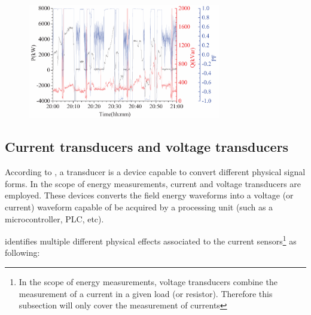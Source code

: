 \begin{figure}[h!]
	\centering
	\begin{minipage}{0.8\textwidth}
		\centering
				\vspace{-0.75em}
		\includegraphics[width=0.75\textwidth,keepaspectratio]{figures/32.EnergyS/liran2014}
				\vspace{-0.75em}
		\label{fig:liran2014}
	\end{minipage}%
	
\end{figure}


\subsection{Current transducers and voltage transducers}
\label{subs:322}	
	According to \cite{webster2012}, a transducer is a device capable to convert different physical signal forms. In the scope of energy measurements, current and voltage transducers are employed. These devices converts the field energy waveforms into a voltage (or current) waveform capable of be acquired by a processing unit (such as a microcontroller, PLC, etc).
	
	\cite{Dalessandro2007} identifies multiple different physical effects associated to the current sensors\footnote{In the scope of energy measurements, voltage transducers combine the measurement of a current in a given load (or resistor). Therefore this subsection will only cover the measurement of currents} as following:
	
